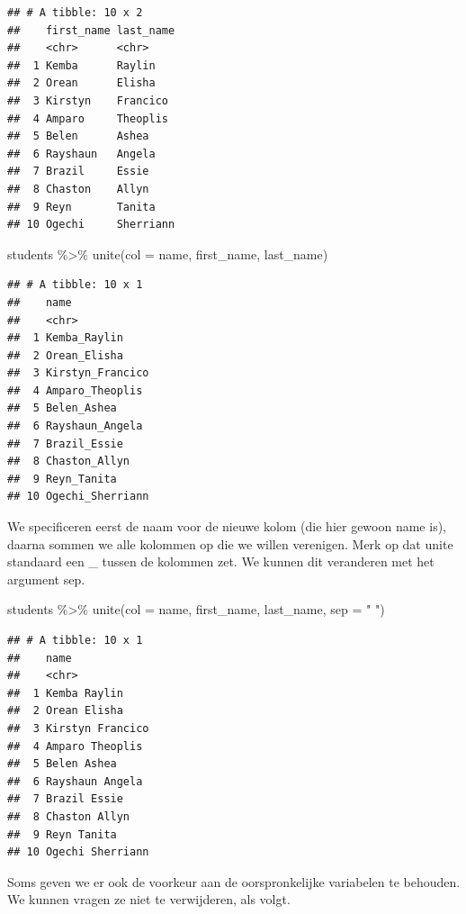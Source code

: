 \documentclass[]{tufte-book}
\newenvironment{Shaded}{}{}
\newcommand{\AttributeTok}[1]{\textcolor[rgb]{0.49,0.56,0.16}{#1}}
\newcommand{\FunctionTok}[1]{\textcolor[rgb]{0.02,0.16,0.49}{#1}}
\newcommand{\NormalTok}[1]{#1}
\newcommand{\SpecialCharTok}[1]{\textcolor[rgb]{0.25,0.44,0.63}{#1}}
\newcommand{\StringTok}[1]{\textcolor[rgb]{0.25,0.44,0.63}{#1}}
\begin{document}
\begin{verbatim}
## # A tibble: 10 x 2
##    first_name last_name
##    <chr>      <chr>    
##  1 Kemba      Raylin   
##  2 Orean      Elisha   
##  3 Kirstyn    Francico 
##  4 Amparo     Theoplis 
##  5 Belen      Ashea    
##  6 Rayshaun   Angela   
##  7 Brazil     Essie    
##  8 Chaston    Allyn    
##  9 Reyn       Tanita   
## 10 Ogechi     Sherriann
\end{verbatim}

\begin{Shaded}
\begin{Highlighting}[]
\NormalTok{students }\SpecialCharTok{\%\textgreater{}\%}
  \FunctionTok{unite}\NormalTok{(}\AttributeTok{col =}\NormalTok{ name, first\_name, last\_name)}
\end{Highlighting}
\end{Shaded}

\begin{verbatim}
## # A tibble: 10 x 1
##    name            
##    <chr>           
##  1 Kemba_Raylin    
##  2 Orean_Elisha    
##  3 Kirstyn_Francico
##  4 Amparo_Theoplis 
##  5 Belen_Ashea     
##  6 Rayshaun_Angela 
##  7 Brazil_Essie    
##  8 Chaston_Allyn   
##  9 Reyn_Tanita     
## 10 Ogechi_Sherriann
\end{verbatim}

We specificeren eerst de naam voor de nieuwe kolom (die hier gewoon name is), daarna sommen we alle kolommen op die we willen verenigen. Merk op dat unite standaard een \_ tussen de kolommen zet. We kunnen dit veranderen met het argument sep.

\begin{Shaded}
\begin{Highlighting}[]
\NormalTok{students }\SpecialCharTok{\%\textgreater{}\%}
  \FunctionTok{unite}\NormalTok{(}\AttributeTok{col =}\NormalTok{ name, first\_name, last\_name, }\AttributeTok{sep =} \StringTok{" "}\NormalTok{)}
\end{Highlighting}
\end{Shaded}

\begin{verbatim}
## # A tibble: 10 x 1
##    name            
##    <chr>           
##  1 Kemba Raylin    
##  2 Orean Elisha    
##  3 Kirstyn Francico
##  4 Amparo Theoplis 
##  5 Belen Ashea     
##  6 Rayshaun Angela 
##  7 Brazil Essie    
##  8 Chaston Allyn   
##  9 Reyn Tanita     
## 10 Ogechi Sherriann
\end{verbatim}

Soms geven we er ook de voorkeur aan de oorspronkelijke variabelen te behouden. We kunnen vragen ze niet te verwijderen, als volgt.
\end{document}
